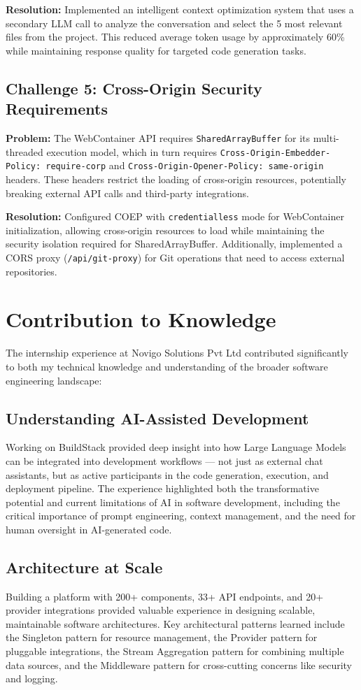 \documentclass[12pt,a4paper,openany]{report}
\begin{document}
\textbf{Resolution:} Implemented an intelligent context optimization system that uses a secondary LLM call to analyze the conversation and select the 5 most relevant files from the project. This reduced average token usage by approximately 60\% while maintaining response quality for targeted code generation tasks.

\subsection{Challenge 5: Cross-Origin Security Requirements}
\textbf{Problem:} The WebContainer API requires \texttt{SharedArrayBuffer} for its multi-threaded execution model, which in turn requires \texttt{Cross-Origin-Embedder-Policy: require-corp} and \texttt{Cross-Origin-Opener-Policy: same-origin} headers. These headers restrict the loading of cross-origin resources, potentially breaking external API calls and third-party integrations.

\textbf{Resolution:} Configured COEP with \texttt{credentialless} mode for WebContainer initialization, allowing cross-origin resources to load while maintaining the security isolation required for SharedArrayBuffer. Additionally, implemented a CORS proxy (\texttt{/api/git-proxy}) for Git operations that need to access external repositories.

\section{Contribution to Knowledge}

The internship experience at Novigo Solutions Pvt Ltd contributed significantly to both my technical knowledge and understanding of the broader software engineering landscape:

\subsection{Understanding AI-Assisted Development}
Working on BuildStack provided deep insight into how Large Language Models can be integrated into development workflows --- not just as external chat assistants, but as active participants in the code generation, execution, and deployment pipeline. The experience highlighted both the transformative potential and current limitations of AI in software development, including the critical importance of prompt engineering, context management, and the need for human oversight in AI-generated code.

\subsection{Architecture at Scale}
Building a platform with 200+ components, 33+ API endpoints, and 20+ provider integrations provided valuable experience in designing scalable, maintainable software architectures. Key architectural patterns learned include the Singleton pattern for resource management, the Provider pattern for pluggable integrations, the Stream Aggregation pattern for combining multiple data sources, and the Middleware pattern for cross-cutting concerns like security and logging.
\end{document}
